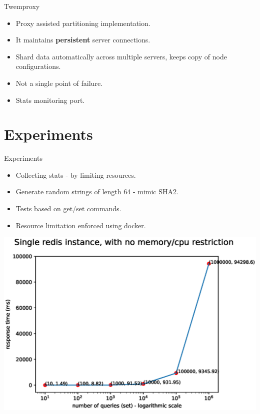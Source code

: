 \documentclass{beamer}
\begin{document}
\begin{frame}{Twemproxy}
\begin{itemize}
    \pause\item Proxy assisted partitioning implementation.
    \pause\item It maintains \textbf{persistent} server connections.
    \pause\item Shard data automatically across multiple servers, keeps copy of node configurations.
    \pause\item Not a single point of failure.
    \pause\item Stats monitoring port.
\end{itemize}
\end{frame}

\section{Experiments}

\begin{frame}{Experiments}
\begin{itemize}
    \pause\item Collecting stats - by limiting resources.
    \pause\item Generate random strings of length 64 - mimic SHA2.
    \pause\item Tests based on get/set commands.
    \pause\item Resource limitation enforced using docker.
\end{itemize}
\end{frame}


\begin{frame}
    \includegraphics[width=\textwidth]{fig1.eps}
\end{frame}
\end{document}
